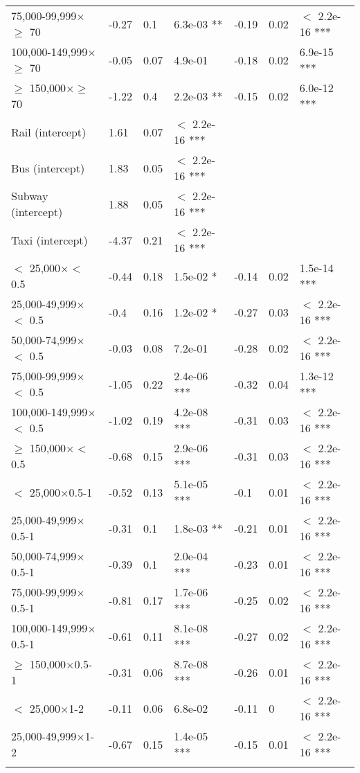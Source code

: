 \documentclass{article}\usepackage[utf8]{inputenc}
\begin{document}
\begin{longtable}[t]{lllllll}
75,000-99,999$\times$$\geq$ 70 & -0.27 & 0.1 & 6.3e-03 ** & -0.19 & 0.02 & $<$ 2.2e-16 ***\\
100,000-149,999$\times$$\geq$ 70 & -0.05 & 0.07 & 4.9e-01 & -0.18 & 0.02 & 6.9e-15 ***\\
$\geq$ 150,000$\times$$\geq$ 70 & -1.22 & 0.4 & 2.2e-03 ** & -0.15 & 0.02 & 6.0e-12 ***\\
Rail (intercept) & 1.61 & 0.07 & $<$ 2.2e-16 *** &  &  & \\
Bus (intercept) & 1.83 & 0.05 & $<$ 2.2e-16 *** &  &  & \\
Subway (intercept) & 1.88 & 0.05 & $<$ 2.2e-16 *** &  &  & \\
Taxi (intercept) & -4.37 & 0.21 & $<$ 2.2e-16 *** &  &  & \\
$<$ 25,000$\times$$<$ 0.5 & -0.44 & 0.18 & 1.5e-02 * & -0.14 & 0.02 & 1.5e-14 ***\\
25,000-49,999$\times$$<$ 0.5 & -0.4 & 0.16 & 1.2e-02 * & -0.27 & 0.03 & $<$ 2.2e-16 ***\\
50,000-74,999$\times$$<$ 0.5 & -0.03 & 0.08 & 7.2e-01 & -0.28 & 0.02 & $<$ 2.2e-16 ***\\
75,000-99,999$\times$$<$ 0.5 & -1.05 & 0.22 & 2.4e-06 *** & -0.32 & 0.04 & 1.3e-12 ***\\
100,000-149,999$\times$$<$ 0.5 & -1.02 & 0.19 & 4.2e-08 *** & -0.31 & 0.03 & $<$ 2.2e-16 ***\\
$\geq$ 150,000$\times$$<$ 0.5 & -0.68 & 0.15 & 2.9e-06 *** & -0.31 & 0.03 & $<$ 2.2e-16 ***\\
$<$ 25,000$\times$0.5-1 & -0.52 & 0.13 & 5.1e-05 *** & -0.1 & 0.01 & $<$ 2.2e-16 ***\\
25,000-49,999$\times$0.5-1 & -0.31 & 0.1 & 1.8e-03 ** & -0.21 & 0.01 & $<$ 2.2e-16 ***\\
50,000-74,999$\times$0.5-1 & -0.39 & 0.1 & 2.0e-04 *** & -0.23 & 0.01 & $<$ 2.2e-16 ***\\
75,000-99,999$\times$0.5-1 & -0.81 & 0.17 & 1.7e-06 *** & -0.25 & 0.02 & $<$ 2.2e-16 ***\\
100,000-149,999$\times$0.5-1 & -0.61 & 0.11 & 8.1e-08 *** & -0.27 & 0.02 & $<$ 2.2e-16 ***\\
$\geq$ 150,000$\times$0.5-1 & -0.31 & 0.06 & 8.7e-08 *** & -0.26 & 0.01 & $<$ 2.2e-16 ***\\
$<$ 25,000$\times$1-2 & -0.11 & 0.06 & 6.8e-02 & -0.11 & 0 & $<$ 2.2e-16 ***\\
25,000-49,999$\times$1-2 & -0.67 & 0.15 & 1.4e-05 *** & -0.15 & 0.01 & $<$ 2.2e-16 ***\\
$$
\end{longtable}
\end{document}

